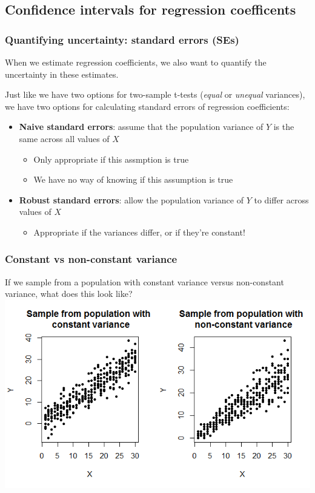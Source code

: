 \documentclass[12pt, 
hyperref={colorlinks=true, linkcolor=blue, urlcolor=cyan}]{beamer}
\begin{document}
\subsection{Confidence intervals for regression coefficents}
\begin{frame}
\frametitle{Quantifying uncertainty: standard errors (SEs)}

When we estimate regression coefficients, we also want to quantify the \color{blue} uncertainty \color{black} in these estimates.\vspace{-0.2cm} \pause

Just like we have two options for two-sample t-tests (\textit{equal} or \textit{unequal} variances), we have \color{blue} two options for calculating standard errors of regression coefficients\color{black}: \vspace{-0.3cm} \pause
\begin{itemize}
\item \textbf{Naive standard errors}: assume that the population variance of $Y$ is the same across all values of $X$ %
	\begin{itemize}
	\item Only appropriate if this assmption is true
	\item We have no way of knowing if this assumption is true
	\end{itemize}
\item \textbf{Robust standard errors}: allow the population variance of $Y$ to differ across values of $X$ %
	\begin{itemize}
	\item Appropriate if the variances differ, or if they're constant!
	\end{itemize}
\end{itemize}
\end{frame}

\begin{frame}
\frametitle{Constant vs non-constant variance}

If we sample from a population with constant variance versus non-constant variance, what does this look like?
\includegraphics[width=\textwidth]{./plots/hetero}

\end{frame}
\end{document}
